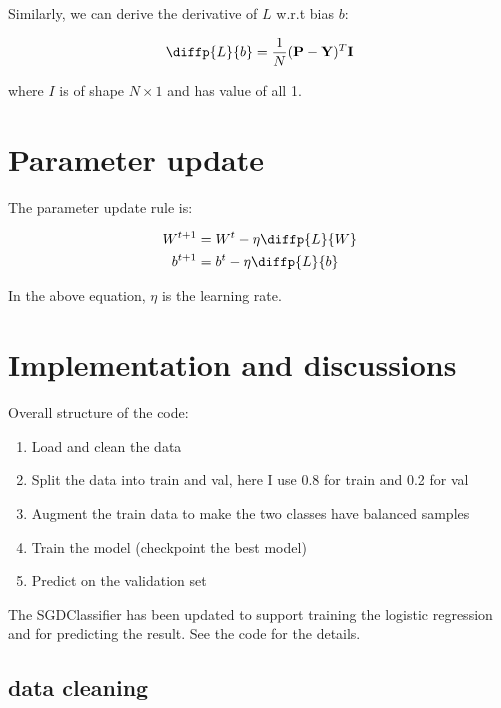 \documentclass[a4paper, 12pt]{article}
\begin{document}
Similarly, we can derive the derivative of $L$ w.r.t bias $b$:

\begin{equation}\label{eq-deriv-L-to_b-matrix}
    \diffp{L}{b} = \frac{1}{N} (\mathbf{P} - \mathbf{Y})^T \mathbf{I}
\end{equation}

where $I$ is of shape $N\times 1$ and has value of all 1.

\section{Parameter update}

The parameter update rule is:

\begin{equation}\label{eq-param-update-rule}
    \begin{aligned}
        W^{t+1} &= W^{t} - \eta \diffp{L}{W} \\
        b^{t+1} &= b^{t} - \eta \diffp{L}{b}
    \end{aligned}
\end{equation}

In the above equation, $\eta$ is the learning rate.

\section{Implementation and discussions}

Overall structure of the code:

\begin{enumerate}
    \item Load and clean the data
    \item Split the data into train and val, here I use 0.8 for train and 0.2 for val
    \item Augment the train data to make the two classes have balanced samples
    \item Train the model (checkpoint the best model)
    \item Predict on the validation set
\end{enumerate}

The SGDClassifier has been updated to support training the logistic regression and for predicting the result.
See the code for the details.

\subsection{data cleaning}
\end{document}

